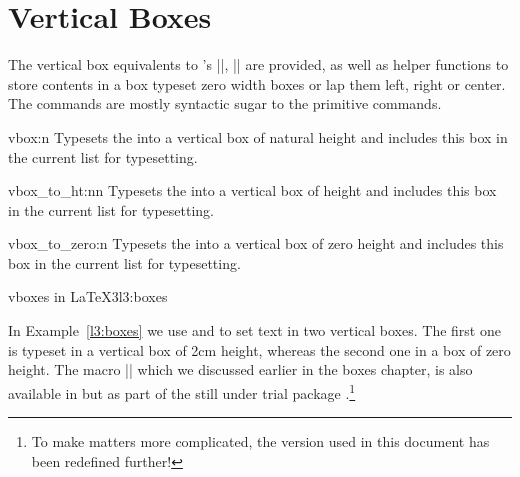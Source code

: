 
\section{Vertical Boxes}
The vertical box equivalents to \tex’s |\vbox|, |\vtop| are provided, as well as helper functions to store contents in a box typeset zero width boxes or lap them left, right or center. The commands are mostly syntactic sugar to the primitive commands. 

\begin{docCommand}{vbox:n}{}
Typesets the  into a vertical box of natural height and includes this box in the current list for typesetting.
\end{docCommand}

\begin{docCommand}{vbox_to_ht:nn}{}
Typesets the  into a vertical box of height  and includes this box in the current list for typesetting.
\end{docCommand}

\begin{docCommand}{vbox_to_zero:n}{}
Typesets the  into a vertical box of zero height and includes this box in the current list for typesetting.
\end{docCommand}

\begin{texexample}{vboxes in LaTeX3}{l3:boxes}
\ExplSyntaxOn
    \par
    \par
\ExplSyntaxOff
\vspace*{1cm}
\end{texexample}

In Example~\ref{l3:boxes} we use  and  to set text in two vertical boxes. The first one is typeset in a vertical box of 2cm height, whereas the second one in a box of zero height. The macro
|\fbox| which we discussed earlier in the \latexe boxes chapter, is also available in  but as part of the still under trial package .\footnote{To make matters more complicated, the version used in this document has been redefined further!} 



